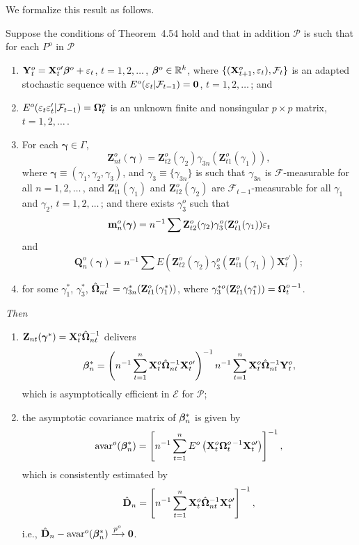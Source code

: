 We formalize this result as follows.

\begin{theorem}\label{thm:4.59}
Suppose the conditions of Theorem~4.54 hold and that in addition $\mathcal{P}$ is such that for each $P^o$ in $\mathcal{P}$
\begin{enumerate}[label=(\roman*)]
\item $\mathbf{Y}_t^o = \mathbf{X}_t^{o\prime}\boldsymbol{\beta}^o + \varepsilon_t$, \quad $t = 1, 2, \ldots$\,, $\boldsymbol{\beta}^o \in \mathbb{R}^k$,
where $\{(\mathbf{X}_{t+1}^o, \varepsilon_t), \mathcal{F}_t\}$ is an adapted stochastic sequence with $E^o(\varepsilon_t|
\mathcal{F}_{t-1}) = \mathbf{0}$, $t = 1, 2, \ldots$\,; and
\item $E^o(\varepsilon_t\varepsilon_t'|\mathcal{F}_{t-1}) = \boldsymbol{\Omega}_t^o$ is an unknown finite and nonsingular $p \times p$ matrix, $t = 1, 2, \ldots$\,.
\item For each $\boldsymbol{\gamma} \in \Gamma$,
\[
\mathbf{Z}_{nt}^o(\boldsymbol{\gamma}) = \mathbf{Z}_{t2}^o(\gamma_2)\gamma_{3n}(\mathbf{Z}_{t1}^o(\gamma_1)),
\]
where $\boldsymbol{\gamma} \equiv (\gamma_1, \gamma_2, \gamma_3)$, and $\gamma_3 \equiv \{\gamma_{3n}\}$ is such that $\gamma_{3n}$ is $\mathcal{F}$-measurable for all $n = 1, 2, \ldots$\,, and $\mathbf{Z}_{t1}^o(\gamma_1)$ and $\mathbf{Z}_{t2}^o(\gamma_2)$ are $\mathcal{F}_{t-1}$-measurable for all $\gamma_1$ and $\gamma_2$, $t = 1, 2, \ldots$\,; and there exists $\gamma_3^o$ such
that
\[
\mathbf{m}_n^o(\boldsymbol{\gamma}) = n^{-1}\sum \mathbf{Z}_{t2}^o(\gamma_2)\gamma_3^o(\mathbf{Z}_{t1}^o(\gamma_1))\varepsilon_t
\]
and
\[
\mathbf{Q}_n^o(\boldsymbol{\gamma}) = n^{-1}\sum E(\mathbf{Z}_{t2}^o(\gamma_2)\gamma_3^o(\mathbf{Z}_{t1}^o(\gamma_1))\mathbf{X}_t^{o\prime});
\]
\item for some $\gamma_1^*$, $\gamma_3^*$, $\hat{\boldsymbol{\Omega}}_{nt}^{-1} = \gamma_{3n}^*(\mathbf{Z}_{t1}^o(\gamma_1^*))$, where $\gamma_3^{*o}(\mathbf{Z}_{t1}^o(\gamma_1^*)) = \boldsymbol{\Omega}_t^{o\,-1}$.
\end{enumerate}

\emph{Then}
\begin{enumerate}[label=(\alph*)]
\item $\mathbf{Z}_{nt}(\boldsymbol{\gamma}^*) = \mathbf{X}_t^o\hat{\boldsymbol{\Omega}}_{nt}^{-1}$ delivers
\[
\boldsymbol{\beta}_n^* = \left(n^{-1}\sum_{t=1}^{n}\mathbf{X}_t^o\hat{\boldsymbol{\Omega}}_{nt}^{-1}\mathbf{X}_t^{o\prime}\right)^{-1}n^{-1}\sum_{t=1}^{n}\mathbf{X}_t^o\hat{\boldsymbol{\Omega}}_{nt}^{-1}\mathbf{Y}_t^o,
\]
which is asymptotically efficient in $\mathcal{E}$ for $\mathcal{P}$;
\item the asymptotic covariance matrix of $\boldsymbol{\beta}_n^*$ is given by
\[
\mathrm{avar}^o(\boldsymbol{\beta}_n^*) = \left[n^{-1}\sum_{t=1}^{n}E^o\left(\mathbf{X}_t^o\boldsymbol{\Omega}_t^{o\,-1}\mathbf{X}_t^{o\prime}\right)\right]^{-1},
\]
which is consistently estimated by
\[
\hat{\mathbf{D}}_n = \left[n^{-1}\sum_{t=1}^{n}\mathbf{X}_t^o\hat{\boldsymbol{\Omega}}_{nt}^{-1}\mathbf{X}_t^{o\prime}\right]^{-1},
\]
i.e., $\hat{\mathbf{D}}_n - \mathrm{avar}^o(\boldsymbol{\beta}_n^*) \xrightarrow{p^o} \mathbf{0}$.
\end{enumerate}
\end{theorem}

